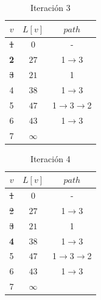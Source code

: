 \documentclass[letterpaper,10pt]{article}
\begin{document}
\begin{enumerate}
        \begin{minipage}[t]{0.3\textwidth}
            \begin{table}[H]
                \centering
            \begin{tabular}{|c|c|c|}\hline
                $ v  $ & $L[v]$ & $path$  \\ \hline
                 \sout{ 1 } & $0$ & -      \\\hline
                 \textbf{2} & $27$ & 1$\rightarrow$3   \\\hline
                 \sout{ 3 } & $21$ & 1   \\\hline
                 4 & $38$ & 1$\rightarrow$3   \\\hline
                 5 & $47$ & 1$\rightarrow$3$\rightarrow$2   \\\hline
                 6 & $43$ & 1$\rightarrow$3   \\\hline
                 7 & $\infty$ &    \\\hline
                \end{tabular}
                \caption{Iteración 3}
                \label{tablitaiteracion3}
            \end{table}
        \end{minipage}
        \begin{minipage}[t]{0.3\textwidth}
            \begin{table}[H]
                \centering
            \begin{tabular}{|c|c|c|}\hline
                $ v  $ & $L[v]$ & $path$  \\ \hline
                 \sout{ 1 } & $0$ & -      \\\hline
                 \sout{ 2 } & $27$ & 1$\rightarrow$3   \\\hline
                 \sout{ 3 } & $21$ & 1   \\\hline
                 \textbf{4} & $38$ & 1$\rightarrow$3   \\\hline
                 5 & $47$ & 1$\rightarrow$3$\rightarrow$2   \\\hline
                 6 & $43$ & 1$\rightarrow$3   \\\hline
                 7 & $\infty$ &    \\\hline
                \end{tabular}
                \caption{Iteración 4}
                \label{tablitaiteracion4}
            \end{table}
        \end{minipage}

\end{enumerate}
\end{document}
